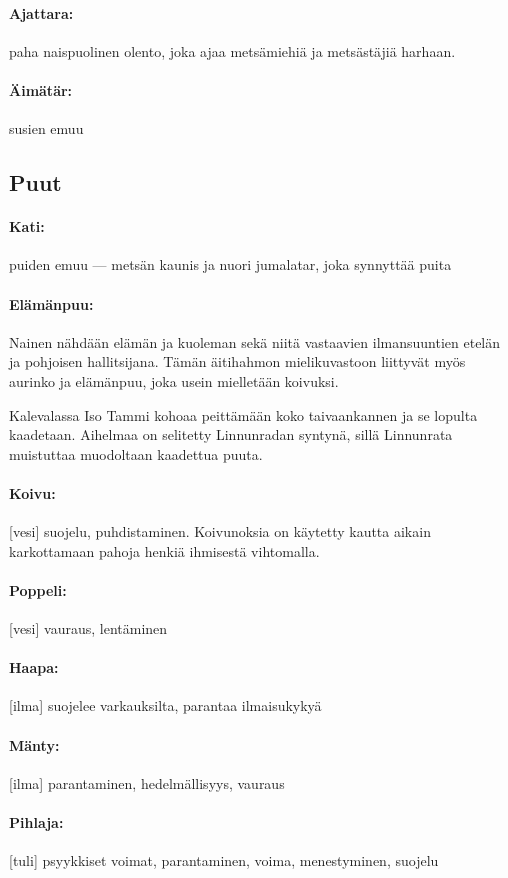   \paragraph{Ajattara:} paha naispuolinen olento, joka ajaa metsämiehiä ja metsästäjiä harhaan.
  \paragraph{Äimätär:} susien emuu


\subsection{Puut}

  \paragraph{Kati:} puiden emuu --- metsän kaunis ja nuori jumalatar, joka synnyttää puita
  \paragraph{Elämänpuu:} Nainen nähdään elämän ja kuoleman sekä niitä vastaavien ilmansuuntien
    etelän ja pohjoisen hallitsijana. Tämän äitihahmon mielikuvastoon liittyvät myös aurinko ja
    elämänpuu, joka usein mielletään koivuksi. \par
    Kalevalassa Iso Tammi kohoaa peittämään koko taivaankannen ja se lopulta kaadetaan. Aihelmaa
    on selitetty Linnunradan syntynä, sillä Linnunrata muistuttaa muodoltaan kaadettua puuta.
  \paragraph{Koivu:} [vesi] suojelu, puhdistaminen. Koivunoksia on käytetty kautta aikain
    karkottamaan pahoja henkiä ihmisestä vihtomalla.
  \paragraph{Poppeli:} [vesi] vauraus, lentäminen
  \paragraph{Haapa:} [ilma] suojelee varkauksilta, parantaa ilmaisukykyä
  \paragraph{Mänty:} [ilma] parantaminen, hedelmällisyys, vauraus
  \paragraph{Pihlaja:} [tuli] psyykkiset voimat, parantaminen, voima, menestyminen, suojelu
